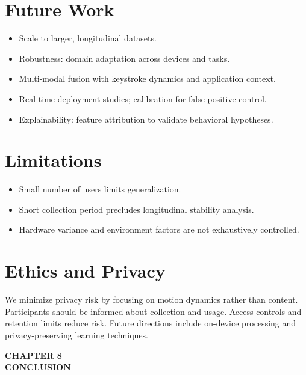 \documentclass[
  12pt,
  a4paper,
]{report}
\providecommand{\tightlist}{%
  \setlength{\itemsep}{0pt}\setlength{\parskip}{0pt}}
\begin{document}
\section{Future Work}\label{future-work}

\begin{itemize}
\tightlist
\item
  Scale to larger, longitudinal datasets.
\item
  Robustness: domain adaptation across devices and tasks.
\item
  Multi-modal fusion with keystroke dynamics and application context.
\item
  Real-time deployment studies; calibration for false positive control.
\item
  Explainability: feature attribution to validate behavioral hypotheses.
\end{itemize}

\section{Limitations}\label{limitations-1}

\begin{itemize}
\tightlist
\item
  Small number of users limits generalization.
\item
  Short collection period precludes longitudinal stability analysis.
\item
  Hardware variance and environment factors are not exhaustively
  controlled.
\end{itemize}

\section{Ethics and Privacy}\label{ethics-and-privacy}

We minimize privacy risk by focusing on motion dynamics rather than
content. Participants should be informed about collection and usage.
Access controls and retention limits reduce risk. Future directions
include on-device processing and privacy-preserving learning techniques.

\newpage
\thispagestyle{plain}

\begin{center}
\vspace\*{2cm}
\textbf{\Large CHAPTER 8}\\[0.5cm]
\textbf{\Large CONCLUSION}
\end{center}
\end{document}
